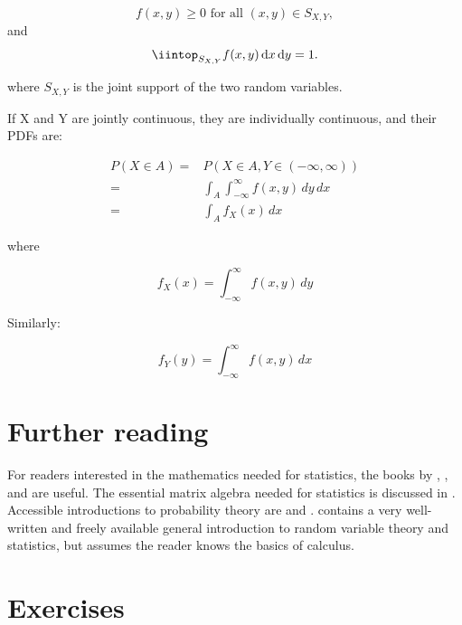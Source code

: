 \documentclass[12pt,]{krantz}
\begin{document}
\begin{equation}
f(x,y)\geq 0\mbox{ for all }(x,y)\in S_{X,Y},
\end{equation}
and
\begin{equation}
\iintop_{S_{X,Y}}f(x,y)\,\mathrm{d} x\,\mathrm{d} y=1.
\end{equation}

where \(S_{X,Y}\) is the joint support of the two random variables.

If X and Y are jointly continuous, they are individually continuous, and their PDFs are:

\begin{equation}
\begin{split}
P(X\in A) = & P(X\in A, Y\in (-\infty,\infty))	\\
= & \int_A \int_{-\infty}^{\infty} f(x,y)\,dy\, dx\\
= & \int_A f_X(x)\, dx
\end{split}	
\end{equation}

\noindent
where

\begin{equation}
f_X(x) = \int_{-\infty}^{\infty} f(x,y)\, dy	
\end{equation}

Similarly:

\begin{equation}
f_Y(y) =  \int_{-\infty}^{\infty} f(x,y)\, dx		
\end{equation}

\hypertarget{further-reading}{%
\section{Further reading}\label{further-reading}}

For readers interested in the mathematics needed for statistics, the books by \citet{fox2009mathematical}, \citet{gill2006essential}, and \citet{moore2013mathematics} are useful. The essential matrix algebra needed for statistics is discussed in \citet{fieller}. Accessible introductions to probability theory are \citet{morin2016probability} and \citet{blitzstein2014introduction}. \citet{kerns} contains a very well-written and freely available general introduction to random variable theory and statistics, but assumes the reader knows the basics of calculus.

\hypertarget{sec:Foundationsexercises}{%
\section{Exercises}\label{sec:Foundationsexercises}}
\end{document}
